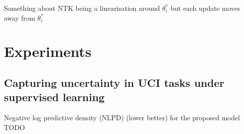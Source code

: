 \documentclass{article}
\newlength{\tblw}
\newcommand{\state}{\ensuremath{\mathbf{s}}}
\newcommand{\action}{\ensuremath{\mathbf{a}}}
\newcommand{\inducingVariable}{\ensuremath{\mathbf{u}}}
\newcommand{\dualParam}[1]{\ensuremath{\bm{\lambda}_{#1}}}
\newcommand{\meanParam}[1]{\ensuremath{\bm{\mu}_{#1}}}
\newcommand{\horizon}{\ensuremath{h}}
\newcommand{\latentFn}{\ensuremath{f}}
\begin{document}


\begin{assumption} \label{assumption-ntk-linearisation}
  Something about NTK being a linearisation around $\theta^{*}_{i}$ but each update moves away from $\theta^{*}_{i}$
\end{assumption}

\cite{rossellApproximateLaplaceApproximations2021}



\section{Experiments}
\label{sec:experiments}


\subsection{Capturing uncertainty in UCI tasks under supervised learning}
%


\begin{table}[t!] 
  \centering\small
  \caption{Negative log predictive density (NLPD) (lower better) for the proposed model TODO} 
	\label{tbl:uci}
	\renewcommand{\arraystretch}{1.}
	\setlength{\tabcolsep}{2pt}
	\setlength{\tblw}{0.15\textwidth}  
	
	\newcommand{\val}[2]{%
		$#1$\textcolor{gray}{\tiny ${\pm}#2$}
	} 

	
\end{table}
\end{document}

